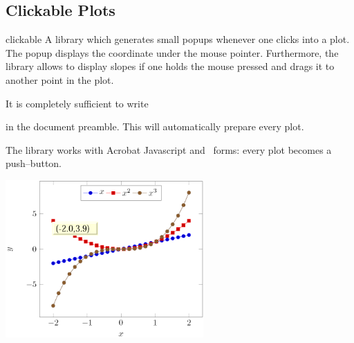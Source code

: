 \subsection{Clickable Plots}
\begin{pgfplotslibrary}{clickable}
	A library which generates small popups whenever one clicks into a plot. The popup displays the coordinate under the mouse pointer. Furthermore, the library allows to display slopes if one holds the mouse pressed and drags it to another point in the plot.


	It is completely sufficient to write 
\begin{codeexample}
\end{codeexample}
	\noindent in the document preamble. This will automatically prepare every plot.

	The library works with Acrobat Javascript and \pdf\ forms: every plot becomes a push--button. 

	\includegraphics[height=6cm]{figures/pgfplotsclickable-fig1.png}
	\hfill


\end{pgfplotslibrary}
